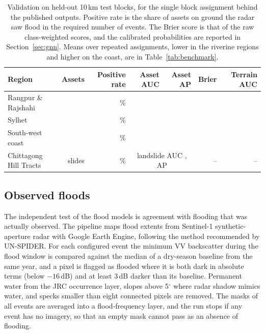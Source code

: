 \documentclass[10pt,a4paper,twocolumn]{article}
\begin{document}
\begin{table}[t]
\centering
\small
\begin{tabular}{lrrrrrr}
\toprule
Region & Assets & Positive rate & Asset AUC & Asset AP & Brier & Terrain AUC \\
\midrule
Rangpur \& Rajshahi & \RRAssets{} & \RRLabelRate{}\,\% & \RRValAUC{} & \RRValAP{} & \RRValBrier{} & \RRHazardAUC{} \\
Sylhet & \SylhetAssets{} & \SylhetLabelRate{}\,\% & \SylhetValAUC{} & \SylhetValAP{} & \SylhetValBrier{} & \SylhetHazardAUC{} \\
South-west coast & \CoastalAssets{} & \CoastalLabelRate{}\,\% & \CoastalValAUC{} & \CoastalValAP{} & \CoastalValBrier{} & \CoastalHazardAUC{} \\
\midrule
Chittagong Hill Tracts & \CHTLandslides{} slides & \CHTLSPositiveRate{}\,\% & \multicolumn{2}{c}{landslide AUC \CHTLSAUC{}, AP \CHTLSAP{}} & -- & -- \\
\bottomrule
\end{tabular}
\caption{Validation on held-out 10\,km test blocks, for the single block assignment behind the published outputs. Positive rate is the share of assets on ground the radar saw flood in the required number of events. The Brier score is that of the raw class-weighted scores, and the calibrated probabilities are reported in Section~\ref{sec:gnn}. Means over repeated assignments, lower in the riverine regions and higher on the coast, are in Table~\ref{tab:benchmark}.}
\label{tab:validation}
\end{table}

\subsection{Observed floods}
\label{sec:observed}

The independent test of the flood models is agreement with flooding that was actually observed. The pipeline maps flood extents from Sentinel-1 synthetic-aperture radar with Google Earth Engine, following the method recommended by UN-SPIDER. For each configured event the minimum VV backscatter during the flood window is compared against the median of a dry-season baseline from the same year, and a pixel is flagged as flooded where it is both dark in absolute terms (below $-16$\,dB) and at least 3\,dB darker than its baseline. Permanent water from the JRC occurrence layer, slopes above 5$^\circ$ where radar shadow mimics water, and specks smaller than eight connected pixels are removed. The masks of all events are averaged into a flood-frequency layer, and the run stops if any event has no imagery, so that an empty mask cannot pass as an absence of flooding.
\end{document}
